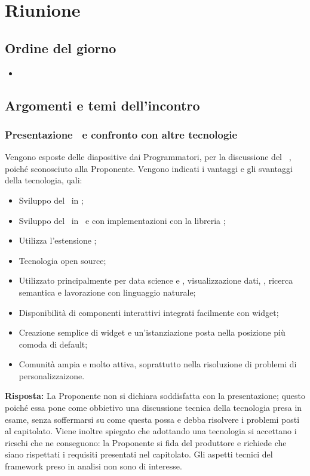 \section{Riunione}
\subsection{Ordine del giorno}
\begin{itemize}
	\item
\end{itemize}

\subsection{Argomenti e temi dell'incontro}

\subsubsection{Presentazione \ e confronto con altre tecnologie}

\par Vengono esposte delle diapositive dai Programmatori, per la discussione del \ , poiché sconosciuto alla Proponente. Vengono indicati i vantaggi e gli svantaggi della tecnologia, qali:
\begin{itemize}
	\item Sviluppo del \ in ;
	\item Sviluppo del \ in \ e con implementazioni con la libreria ;
	\item Utilizza l'estensione ;
	\item Tecnologia open source;
	\item Utilizzato principalmente per data science e , visualizzazione dati, , ricerca semantica e lavorazione con linguaggio naturale;
	\item Disponibilità di componenti interattivi integrati facilmente con widget;
	\item Creazione semplice di widget e un'istanziazione posta nella posizione più comoda di default;
	\item Comunità ampia e molto attiva, soprattutto nella risoluzione di problemi di personalizzaizone.
\end{itemize}

\par \textbf{Risposta:} La Proponente non si dichiara soddisfatta con la presentazione; questo poiché essa pone come obbietivo una discussione tecnica della tecnologia presa in esame, senza soffermarsi su come questa possa e debba risolvere i problemi posti al capitolato. 
Viene inoltre spiegato che adottando una tecnologia si accettano i ricschi che ne conseguono: la Proponente si fida del produttore e richiede che siano rispettati i requisiti presentati nel capitolato. 
Gli aspetti tecnici del framework preso in analisi non sono di interesse.

